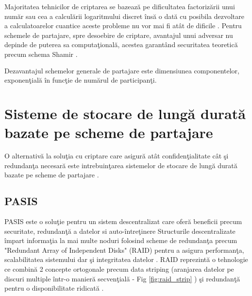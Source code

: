\documentclass{llncs}
\newcommand{\todo}[1]{{\color{red}{TODO #1}}}
\begin{document}
Majoritatea tehnicilor de criptarea se bazeaz\u{a} pe dificultatea factoriz\u{a}rii unui num\u{a}r sau cea a calcul\u{a}rii logaritmului discret \^{i}ns\u{a} o dat\u{a} cu posibila dezvoltare a calculatoarelor cuantice aceste probleme nu vor mai fi at\^{a}t de dificile \cite{Shor:1994}.
Pentru schemele de partajare, spre desoebire de criptare, avantajul unui adversar nu depinde de puterea sa computa\c{t}ional\u{a}, acestea garant\^{a}nd securitatea teoretic\u{a} precum schema Shamir \cite{S:1979}.

Dezavantajul schemelor generale de partajare este dimensiunea componentelor, exponen\c{t}ial\u{a} \^{i}n func\c{t}ie de num\u{a}rul de participan\c{t}i. \cite{Survey:2011}


\section{Sisteme de stocare de lung\u{a} durat\u{a} bazate pe scheme de partajare}
\label{sec:long_term_systems_full}

O alternativ\u{a} la solu\c{t}ia cu criptare care asigur\u{a} at\^{a}t confiden\c{t}ialitate c\^{a}t \c{s}i redundan\c{t}a necesar\u{a} este intrebuin\c{t}area sistemelor de stocare de lung\u{a} durat\u{a} bazate pe scheme de partajare \cite{W:2000,SB:2005,SGMV:2009}.

\subsection{PASIS}
\label{sec:desc_pasis}
PASIS este o solu\c{t}ie pentru un sistem descentralizat care ofer\u{a} beneficii precum securitate, redundan\c{t}\u{a} a datelor si auto-\^{i}ntre\c{t}inere \cite{W:2000}
Structurile descentralizate \^{i}mpart informa\c{t}ia la mai multe noduri folosind scheme de redundan\c{t}a precum "Redundant Array of Independent Disks" (RAID) pentru a asigura performan\c{t}a, scalabilitatea sistemului dar \c{s}i integritatea datelor \cite{Patterson:1988}.
RAID reprezint\u{a} o tehnologie ce combin\u{a} 2 concepte ortogonale precum data striping (aranjarea datelor pe discuri multiple \^{i}ntr-o manier\u{a} secven\c{t}ial\u{a} - Fig \ref{fig:raid_strip} \todo{Figura, nu inteleg de ce nu o citeaza..}) \c{s}i redundan\c{t}\u{a} pentru o disponibilitate ridicat\u{a} \cite{Chen:1994}.
\end{document}
